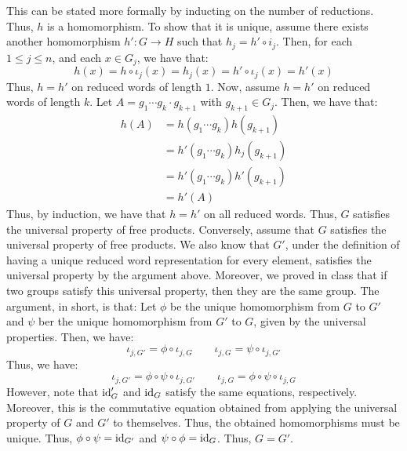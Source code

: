 \documentclass[12pt]{article}
\begin{document}
\begin{solu}
\begin{enumerate}
    \end{enumerate}
    This can be stated more formally by inducting on the number of reductions. Thus, $h$ is a homomorphism. To show that it is unique, assume there exists another homomorphism $h': G \to H$ such that $h_j = h' \circ i_j$. Then, for each $1 \leq j \leq n$, and each $x \in G_j$, we have that: 
    \[ h(x) = h \circ \iota_j(x) = h_j(x) = h' \circ \iota_j(x) = h'(x) \]
    Thus, $h = h'$ on reduced words of length $1$. Now, assume $h = h'$ on reduced words of length $k$. Let $A = g_1 \cdots g_k \cdot g_{k+1}$ with $g_{k+1} \in G_j$. Then, we have that:
    \begin{align*}
        h(A) &= h(g_1 \cdots g_k)h(g_{k+1}) \\
        &= h'(g_1 \cdots g_k)h_{j}(g_{k+1}) \\
        &= h'(g_1 \cdots g_k)h'(g_{k+1}) \\
        &= h'(A)
    \end{align*}
    Thus, by induction, we have that $h = h'$ on all reduced words. Thus, $G$ satisfies the universal property of free products. \bbni 
    Conversely, assume that $G$ satisfies the universal property of free products. We also know that $G'$, under the definition of having a unique reduced word representation for every element, satisfies the universal property by the argument above. Moreover, we proved in class that if two groups satisfy this universal property, then they are the same group. The argument, in short, is that: Let $\phi$ be the unique homomorphism from $G$ to $G'$ and $\psi$ ber the unique homomorphism from $G'$ to $G$, given by the universal properties. Then, we have: 
    \[ \iota_{j, G'} = \phi \circ \iota_{j, G} \qquad \iota_{j, G} = \psi \circ \iota_{j, G'} \]
    Thus, we have:
    \[ \iota_{j, G'} = \phi \circ \psi \circ \iota_{j, G'} \qquad \iota_{j, G} = \phi \circ \psi \circ \iota_{j, G} \]
    However, note that $\operatorname{id}_G'$ and $\operatorname{id}_G$ satisfy the same equations, respectively. Moreover, this is the commutative equation obtained from applying the universal property of $G$ and $G'$ to themselves. Thus, the obtained homomorphisms must be unique. Thus, $\phi \circ \psi = \operatorname{id}_{G'}$ and $\psi \circ \phi = \operatorname{id}_G$. Thus, $G = G'$.
\end{solu}
\newpage
\end{document}
